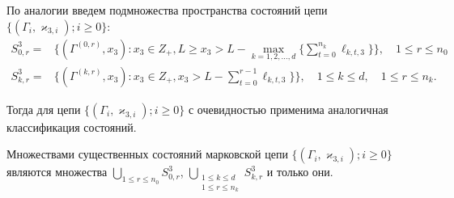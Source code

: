 \documentclass[a4paper,12pt,russian]{extarticle}
\newcommand{\MarkThree}{\{(\Gamma_i, \varkappa_{3,i}); i \geqslant 0\}}
\begin{document}
По аналогии введем подмножества пространства состояний цепи $\MarkThree$:
\begin{equation*}
\begin{aligned}
S^3_{0,r} = & \{(\Gamma^{(0,r)},x_3) \colon x_3\in Z_+, L \geqslant x_3 > L - \max\limits_{k=1, 2, \ldots, d}\{\sum_{t=0}^{n_k} \ell_{k,t,3}\}\}, \quad 1 \leqslant r \leqslant n_0 \\
S^3_{k,r} = & \{(\Gamma^{(k,r)},x_3) \colon x_3\in Z_+, x_3 > L - \sum_{t=0}^{r-1} \ell_{k,t,3}\} \}, \quad 1 \leqslant k \leqslant d, \quad 1 \leqslant r \leqslant n_k.
\end{aligned}
\end{equation*}

Тогда для цепи $\MarkThree$ с очевидностью применима аналогичная классификация состояний.
\begin{theorem}
Множествами существенных состояний марковской цепи $\MarkThree$ являются множества $\bigcup\limits_{1 \leqslant r \leqslant n_0}S^3_{0,r}$, $\bigcup\limits_{\substack{1 \leqslant k \leqslant d\\ 1 \leqslant r \leqslant n_k}} S^3_{k,r}$ и только они.
\end{theorem}
\end{document}
